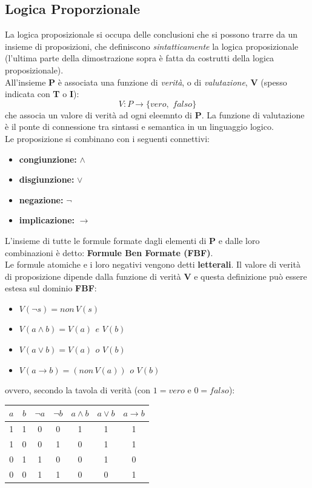 \documentclass[a4paper,12pt, oneside]{book}
\begin{document}
\subsection{Logica Proporzionale}
La logica proposizionale si occupa delle conclusioni che si possono trarre da un insieme di proposizioni, che definiscono \textit{sintatticamente} la logica proposizionale (l'ultima parte della dimostrazione sopra è fatta da costrutti della logica proposizionale).\\
All'insieme \textbf{P} è associata una funzione di \textit{verità}, o di \textit{valutazione}, \textbf{V} (spesso indicata con \textbf{T} o \textbf{I}):
$$V:P\to\{vero,\,\,falso\}$$
che associa un valore di verità ad ogni eleemnto di \textbf{P}. La funzione di valutazione è il ponte di connessione tra sintassi e semantica in un linguaggio logico.\\
Le proposizione si combinano con i seguenti connettivi:
\begin{itemize}
\item \textbf{congiunzione:} $\wedge$
\item \textbf{disgiunzione:} $\vee$
\item \textbf{negazione:} $\neg$
\item \textbf{implicazione:} $\to$
\end{itemize}
L'insieme di tutte le formule formate dagli elementi di \textbf{P} e dalle loro combinazioni è detto: \textbf{Formule Ben Formate (FBF)}.\\
Le formule atomiche e i loro negativi vengono detti \textbf{letterali}. Il valore di verità di proposizione dipende dalla funzione di verità \textbf{V} e questa definizione può essere estesa sul dominio \textbf{FBF}:
\begin{itemize}
\item $V(\neg s)=non\,V(s)$
\item $V(a\wedge b)=V(a)\,\ e\,\, V(b)$
\item $V(a\vee b)=V(a)\,\ o\,\, V(b)$
\item $V(a\to b)=(non\,V(a))\,\ o\,\, V(b)$
\end{itemize}
ovvero, secondo la tavola di verità (con $1=vero$ e $0=falso$):
\begin{center}
\begin{tabular}{|c|c|c|c|c|c|c|}
\hline
$a$ & $b$ & $\neg a$ & $\neg b$ & $a\wedge b$ & $a\vee b$ & $a\to b$\\
\hline
1 & 1 & 0 & 0 & 1 & 1 & 1\\
\hline
1 & 0 & 0 & 1 & 0 & 1 & 1\\
\hline
0 & 1 & 1 & 0 & 0 & 1 & 0\\
\hline
0 & 0 & 1 & 1 & 0 & 0 & 1\\
\hline
\end{tabular}
\end{center}
\end{document}

